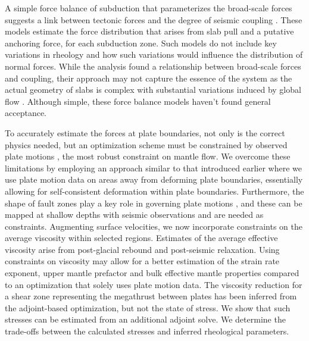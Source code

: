 \documentclass[12pt]{article}
\begin{document}
A simple force balance of subduction that parameterizes the broad-scale forces suggests a link between tectonic forces and the degree of seismic coupling \citep{scholz1995mechanism, scholz2012seismic}. 
These models estimate the force distribution that arises from slab pull and a putative anchoring force, for each subduction zone. Such models do not include key variations in rheology and how such variations would influence the distribution of  normal forces.  While the analysis found a relationship between broad-scale forces and coupling, their approach may not capture the essence of the system as the actual geometry of slabs is complex with substantial variations induced by global flow \citep{scholz2012seismic}. 
Although simple, these force balance models haven't found general acceptance.


  To accurately estimate the forces at plate boundaries, not only is the correct physics needed, but an optimization scheme must be constrained by observed plate motions \citep{BursteddeStadlerAlisicEtAl13,Stadler27082010}, the most robust constraint on mantle flow. We overcome these limitations by employing an approach  similar to that introduced earlier \citep{ratnaswamy2015adjoint} where we use plate motion data on areas away from deforming plate boundaries, essentially allowing for self-consistent deformation within plate boundaries. 
Furthermore, the shape of fault zones play a key role in governing plate motions \citep{Zhong10021995}, and these can be mapped at shallow depths with seismic observations and are needed as constraints.
Augmenting surface velocities, we now incorporate constraints on the average viscosity within selected regions. Estimates of the average effective viscosity arise from post-glacial rebound and post-seismic relaxation. Using constraints on viscosity may allow for a better estimation of the strain rate exponent, upper mantle prefactor and bulk effective mantle properties compared to an optimization that solely uses plate motion data. 
The viscosity reduction for a shear zone representing the megathrust between plates has been inferred from the adjoint-based optimization, but not the state of stress. We show that such stresses can be estimated from an additional adjoint solve.
We determine the trade-offs between the calculated stresses and inferred rheological parameters. 
\end{document}

